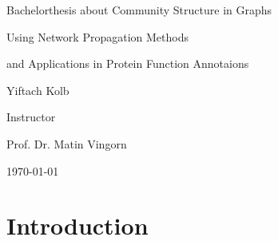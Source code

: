 \documentclass[a4paper,10pt]{article}
\theoremstyle{definition}
\theoremstyle{remark}
\theoremstyle{plain}
\begin{document}
\renewcommand{\thesubsection}{\thesection.\alph{subsection}}\renewcommand{\thesubsection}{\thesection.\alph{subsection}}

\begin{titlepage}
	\centering
    {\scshape\LARGE \par Bachelorthesis about Community Structure in Graphs
    \par Using Network Propagation Methods 
    \par and Applications in Protein Function Annotaions}
    \vfill
  	{\Large Yiftach Kolb \par}
    \vfill
	  {\Large Instructor\par
    Prof. Dr. Matin Vingorn 
    \par}
    {\large \today\par}
\end{titlepage}





\section{Introduction}
%
\end{document}
